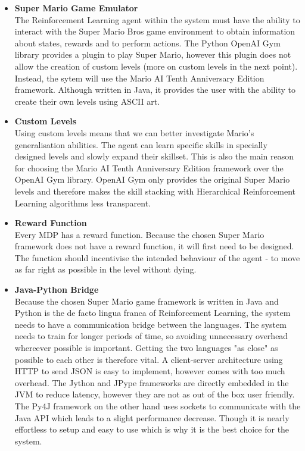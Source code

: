 \documentclass[notitlepage,a4paper,11pt]{article}
\begin{document}
\begin{itemize}

	\item \textbf{Super Mario Game Emulator}\\ 
	The Reinforcement Learning agent within the system must have the ability to interact with the Super Mario Bros game environment to obtain information about states, rewards and to perform actions. The Python OpenAI Gym library provides a plugin to play Super Mario, however this plugin does not allow the creation of custom levels (more on custom levels in the next point). Instead, the sytem will use the Mario AI Tenth Anniversary Edition \cite{marioai} framework. Although written in Java, it provides the user with the ability to create their own levels using ASCII art.
	
	\item \textbf{Custom Levels}\\
	Using custom levels means that we can better investigate Mario's generalisation abilities. The agent can learn specific skills in specially designed levels and slowly expand their skillset. This is also the main reason for choosing the Mario AI Tenth Anniversary Edition framework over the OpenAI Gym library. OpenAI Gym only provides the original Super Mario levels and therefore makes the skill stacking with Hierarchical Reinforcement Learning algorithms less transparent.
	
	\item \textbf{Reward Function}\\
Every MDP has a reward function. Because the chosen Super Mario framework does not have a reward function, it will first need to be designed. The function should incentivise the intended behaviour of the agent - to move as far right as possible in the level without dying.
	
	\item \textbf{Java-Python Bridge}\\
	Because the chosen Super Mario game framework is written in Java and Python is the de facto lingua franca of Reinforcement Learning, the system needs to have a communication bridge between the languages. The system needs to train for longer periods of time, so avoiding unnecessary overhead whereever possible is important. Getting the two languages "as close" as possible to each other is therefore vital. A client-server architecture using HTTP to send JSON is easy to implement, however comes with too much overhead. The Jython \cite{jython} and JPype \cite{jpype} frameworks are directly embedded in the JVM to reduce latency, however they are not as out of the box user friendly. The Py4J \cite{py4j} framework on the other hand uses sockets to communicate with the Java API which leads to a slight performance decrease. Though it is nearly effortless to setup and easy to use which is why it is the best choice for the system.
	

\end{itemize}
\end{document}
